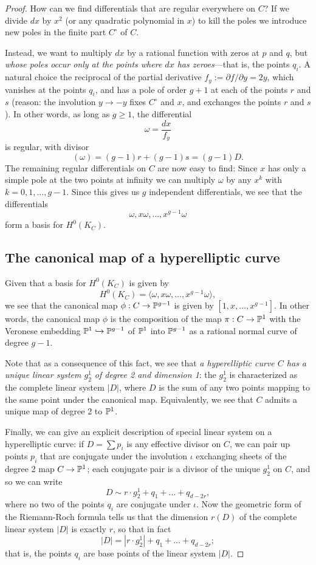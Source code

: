 \begin{proof}
How can we find differentials that are regular everywhere on $C$? If we divide $dx$ by $x^2$ (or any quadratic polynomial in $x$) to kill the poles we  introduce new poles in the finite part $C^\circ$ of $C$. 

Instead, we want to multiply $dx$ by a rational function with zeros at $p$ and $q$, but \emph{whose poles occur only at the points where $dx$ has zeroes}---that is, the points $q_i$.  A natural choice the reciprocal of the partial derivative $f_y := \partial f/ \partial y = 2y$, which vanishes at the points $q_i$, and has  a pole of order $g+1$ at each of the points $r$ and $s$ (reason: the involution $y\to -y$ fixes $C^\circ$ and $x$, and exchanges the points $r$ and $s$). In other words, as long as $g \geq 1$, the differential
$$
\omega = \frac{dx}{f_y}
$$
is regular, with divisor
$$
(\omega) = (g-1)r + (g-1)s = (g-1)D.
$$
The remaining regular differentials on $C$ are now easy to find: Since $x$ has only a simple pole
at the two points at infinity we can  multiply $\omega$ by any $x^k$ with $k = 0, 1, \dots, g-1$. Since this gives us $g$ independent differentials, we see that the differentials
$$
\omega, x\omega, \dots, x^{g-1}\omega
$$
  form a basis for $H^0(K_C)$.

\subsection{The canonical map of a hyperelliptic curve}\label{hyperelliptic special}

Given that a basis for $H^0(K_C)$ is given by 
$$
H^0(K_C) = \langle \omega, x\omega,\dots,x^{g-1}\omega \rangle,
$$
we see that the canonical map $\phi : C \to \PP^{g-1}$ is given by $[1,x,\dots,x^{g-1}]$. In other words, the canonical map $\phi$ is  the composition of the map $\pi : C \to \PP^1$ with the Veronese embedding $\PP^1 \hookrightarrow \PP^{g-1}$ of $\PP^1$ into $\PP^{g-1}$ as a rational normal curve of degree $g-1$.

Note that as a consequence of this fact, we see that \emph{a hyperelliptic curve $C$ has a \emph{unique} linear system $g^1_2$ of degree 2 and dimension 1}: the $g^1_2$ is characterized as the complete linear system $|D|$, where $D$ is the sum of any two points mapping to the same point under the canonical map. Equivalently, we see that $C$ admits  a unique map of degree 2 to $\PP^1$. 

Finally, we can give an explicit description of special linear system on a hyperelliptic curve: if $D = \sum p_i$ is any effective divisor on $C$, we can pair up points $p_i$ that are conjugate under the involution $\iota$ exchanging sheets of the degree 2 map $C \to \PP^1$; each conjugate pair is a divisor of the unique $g^1_2$ on $C$, and so we can write
$$
D \sim r\cdot g^1_2 + q_1 + \dots + q_{d-2r},
$$
where no two of the points $q_i$ are conjugate under $\iota$. Now the geometric form of the Riemann-Roch formula tells us that the dimension $r(D)$ of the complete linear system $|D|$ is exactly $r$, so that in fact 
$$
|D| = |r\cdot g^1_2| + q_1 + \dots + q_{d-2r};
$$
that is, the points $q_i$ are base points of the linear system $|D|$.


\end{proof}
